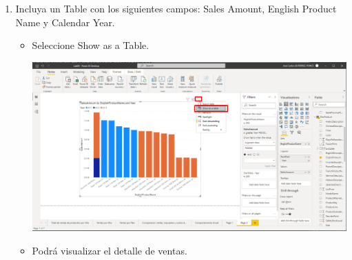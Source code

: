\documentclass{article}
\begin{document}
\begin{enumerate}[\tab 1.]
        \item Incluya un Table con los siguientes campos: Sales Amount, English Product Name y Calendar Year.
        \begin{itemize}
            \item Seleccione Show as a Table.
            \begin{center}
                \includegraphics[width=13cm]{./images/16.1.png}
            \end{center}
            \newpage
            \item Podrá visualizar el detalle de ventas.
            \begin{center}
            

\end{center}
\end{itemize}
\end{enumerate}
\end{document}
